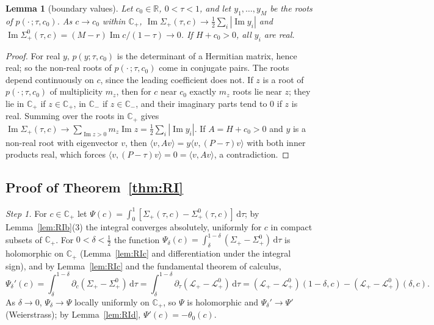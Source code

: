 \documentclass[11pt]{amsart}
\newtheorem{lemma}[theorem]{Lemma}
\theoremstyle{definition}
\theoremstyle{remark}
\numberwithin{equation}{section}
\newcommand{\R}{\mathbb{R}}
\newcommand{\C}{\mathbb{C}}
\renewcommand{\Im}{\operatorname{Im}}
\newcommand{\ip}[2]{\langle #1,#2\rangle}
\newcommand{\dd}{\,\mathrm{d}}
\begin{document}
\begin{lemma}[boundary values]\label{lem:RIe}
Let $c_0\in\R$, $0<\tau<1$, and let $y_1,\dots,y_M$ be the roots of $p(\cdot\,;\tau,c_0)$. As $c\to c_0$ within $\C_+$,
$\Im\Sigma_+(\tau,c)\to\frac12\sum_i|\Im y_i|$ and $\Im\Sigma^0_+(\tau,c)=(M-r)\Im c/(1-\tau)\to0$. If $H+c_0>0$, all $y_i$
are real.
\end{lemma}

\begin{proof}
For real $y$, $p(y;\tau,c_0)$ is the determinant of a Hermitian matrix, hence real; so the non-real roots of
$p(\cdot\,;\tau,c_0)$ come in conjugate pairs. The roots depend continuously on $c$, since the leading coefficient does not.
If $z$ is a root of $p(\cdot\,;\tau,c_0)$ of multiplicity $m_z$, then for $c$ near $c_0$ exactly $m_z$ roots lie near $z$; they lie
in $\C_+$ if $z\in\C_+$, in $\C_-$ if $z\in\C_-$, and their imaginary parts tend to $0$ if $z$ is real. Summing over the roots
in $\C_+$ gives $\Im\Sigma_+(\tau,c)\to\sum_{\Im z>0}m_z\Im z=\frac12\sum_i|\Im y_i|$. If $A=H+c_0>0$ and $y$ is a non-real
root with eigenvector $v$, then $\ip v{Av}=y\ip v{(P-\tau)v}$ with both inner products real, which forces
$\ip v{(P-\tau)v}=0=\ip v{Av}$, a contradiction.
\end{proof}

\subsection{Proof of Theorem~\ref{thm:RI}}
\emph{Step 1.} For $c\in\C_+$ let $\Psi(c)=\int_0^1[\Sigma_+(\tau,c)-\Sigma^0_+(\tau,c)]\dd\tau$; by
Lemma~\ref{lem:RIb}(3) the integral converges absolutely, uniformly for $c$ in compact subsets of $\C_+$. For
$0<\delta<\frac12$ the function $\Psi_\delta(c)=\int_\delta^{1-\delta}(\Sigma_+-\Sigma^0_+)\dd\tau$ is holomorphic on $\C_+$
(Lemma~\ref{lem:RIc} and differentiation under the integral sign), and by Lemma~\ref{lem:RIc} and the fundamental theorem of
calculus,
\[
\Psi_\delta'(c)=\int_\delta^{1-\delta}\partial_c(\Sigma_+-\Sigma^0_+)\dd\tau=\int_\delta^{1-\delta}\partial_\tau(\mathcal L_+-\mathcal L^0_+)\dd\tau
=(\mathcal L_+-\mathcal L^0_+)(1-\delta,c)-(\mathcal L_+-\mathcal L^0_+)(\delta,c).
\]
As $\delta\to0$, $\Psi_\delta\to\Psi$ locally uniformly on $\C_+$, so $\Psi$ is holomorphic and $\Psi_\delta'\to\Psi'$
(Weierstrass); by Lemma~\ref{lem:RId}, $\Psi'(c)=-\theta_0(c)$.
\end{document}
